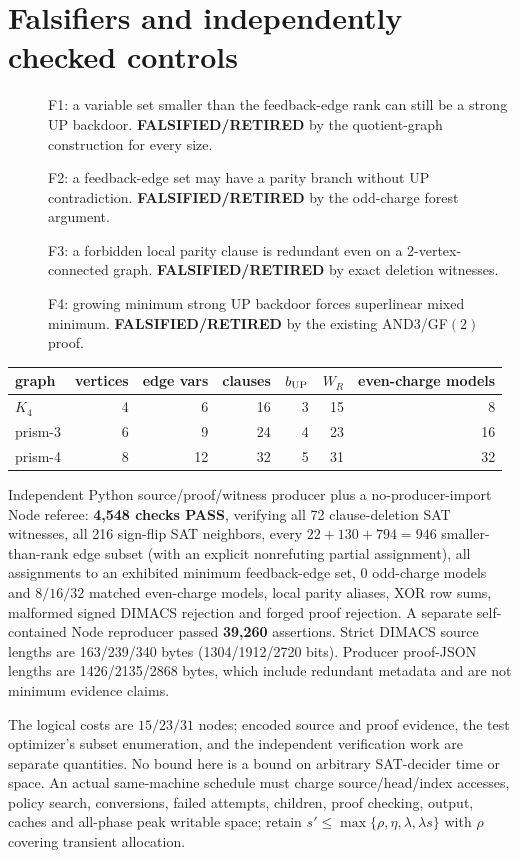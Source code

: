\documentclass[11pt]{article}
\begin{document}
\section*{Falsifiers and independently checked controls}
\begin{description}
\item[] F1: a variable set smaller than the feedback-edge rank can still be a strong UP backdoor. \textbf{FALSIFIED/RETIRED} by the quotient-graph construction for every size.
\item[] F2: a feedback-edge set may have a parity branch without UP contradiction. \textbf{FALSIFIED/RETIRED} by the odd-charge forest argument.
\item[] F3: a forbidden local parity clause is redundant even on a 2-vertex-connected graph. \textbf{FALSIFIED/RETIRED} by exact deletion witnesses.
\item[] F4: growing minimum strong UP backdoor forces superlinear mixed minimum. \textbf{FALSIFIED/RETIRED} by the existing AND3/GF$(2)$ proof.
\end{description}
\begin{center}\begin{tabular}{lrrrrrr}\toprule
graph&vertices&edge vars&clauses&$b_{\rm UP}$&$W_R$&even-charge models\\\midrule
$K_4$&4&6&16&3&15&8\\
prism-3&6&9&24&4&23&16\\
prism-4&8&12&32&5&31&32\\\bottomrule\end{tabular}\end{center}
Independent Python source/proof/witness producer plus a no-producer-import Node referee: \textbf{4,548 checks PASS}, verifying all 72 clause-deletion SAT witnesses, all 216 sign-flip SAT neighbors, every $22+130+794=946$ smaller-than-rank edge subset (with an explicit nonrefuting partial assignment), all assignments to an exhibited minimum feedback-edge set, 0 odd-charge models and $8/16/32$ matched even-charge models, local parity aliases, XOR row sums, malformed signed DIMACS rejection and forged proof rejection. A separate self-contained Node reproducer passed \textbf{39,260} assertions. Strict DIMACS source lengths are 163/239/340 bytes (1304/1912/2720 bits). Producer proof-JSON lengths are 1426/2135/2868 bytes, which include redundant metadata and are not minimum evidence claims.

The logical costs are $15/23/31$ nodes; encoded source and proof evidence, the test optimizer's subset enumeration, and the independent verification work are separate quantities. No bound here is a bound on arbitrary SAT-decider time or space. An actual same-machine schedule must charge source/head/index accesses, policy search, conversions, failed attempts, children, proof checking, output, caches and all-phase peak writable space; retain $s'\le\max\{\rho,\eta,\lambda,\lambda s\}$ with $\rho$ covering transient allocation.
\end{document}
